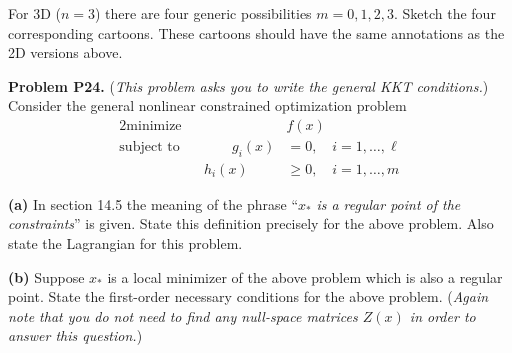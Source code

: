 \documentclass[12pt]{amsart}
\newcommand{\prob}[1]{\bigskip\noindent\textbf{#1}\quad }
\newcommand{\epart}[1]{\medskip\noindent\textbf{(#1)}\quad }
\begin{document}
\bigskip
For 3D ($n=3$) there are four generic possibilities $m=0,1,2,3$.  Sketch the four corresponding cartoons.  These cartoons should have the same annotations as the 2D versions above.


\medskip
\prob{Problem P24.}  (\emph{This problem asks you to write the general KKT conditions.})  Consider the general nonlinear constrained optimization problem
\begin{alignat*}{2}
    \text{minimize}   &&  &f(x) \\
    \text{subject to} && \qquad g_i(x) &= 0, \quad i=1,\dots,\ell \\
                      &&       h_i(x) &\ge 0, \quad i=1,\dots,m
\end{alignat*}

\epart{a}  In section 14.5 the meaning of the phrase ``$x_*$ \emph{is a regular point of the constraints}'' is given.  State this definition precisely for the above problem.  Also state the Lagrangian for this problem.

\epart{b}  Suppose $x_*$ is a local minimizer of the above problem which is also a regular point.  State the first-order necessary conditions for the above problem.  (\emph{Again note that you do \emph{not} need to find any null-space matrices $Z(x)$ in order to answer this question.})


\end{document}

